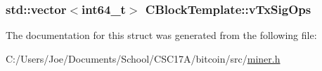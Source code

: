 \subsubsection[{v\+Tx\+Sig\+Ops}]{\setlength{\rightskip}{0pt plus 5cm}std\+::vector$<$int64\+\_\+t$>$ C\+Block\+Template\+::v\+Tx\+Sig\+Ops}\label{struct_c_block_template_a13326eb92a7d2fc073d9f5660dfcdde5}


The documentation for this struct was generated from the following file\+:\begin{DoxyCompactItemize}
\item 
C\+:/\+Users/\+Joe/\+Documents/\+School/\+C\+S\+C17\+A/bitcoin/src/\hyperlink{miner_8h}{miner.\+h}\end{DoxyCompactItemize}
